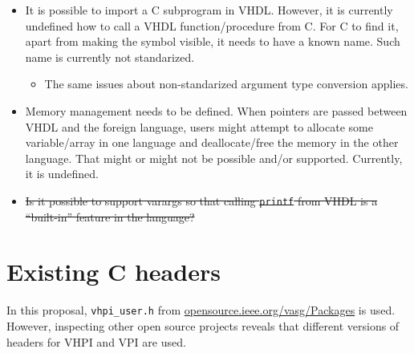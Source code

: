 \documentclass[
]{article}
\providecommand{\tightlist}{%
  \setlength{\itemsep}{0pt}\setlength{\parskip}{0pt}}
\begin{document}
\begin{itemize}
  \begin{itemize}
  \tightlist
  \item
    By the same token, VHDL procedures/functions can have arguments of mode \texttt{in}, \texttt{out} or \texttt{inout}, whereas in C functions are allowed to return a single argument. Hence, this is currently implementation-dependent.
  \end{itemize}
\item
  It is possible to import a C subprogram in VHDL. However, it is currently undefined how to call a VHDL function/procedure from C. For C to find it, apart from making the symbol visible, it needs to have a known name. Such name is currently not standarized.

  \begin{itemize}
  \tightlist
  \item
    The same issues about non-standarized argument type conversion applies.
  \end{itemize}
\item
  Memory management needs to be defined. When pointers are passed between VHDL and the foreign language, users might attempt to allocate some variable/array in one language and deallocate/free the memory in the other language. That might or might not be possible and/or supported. Currently, it is undefined.
\item
  \st{Is it possible to support varargs so that calling \mbox{\texttt{printf}} from VHDL is a ``built-in'' feature in the language?}
\end{itemize}

\hypertarget{existing-c-headers}{%
\section{Existing C headers}\label{existing-c-headers}}

In this proposal, \texttt{vhpi\_user.h} from \href{https://opensource.ieee.org/vasg/Packages/-/blob/release/code/vhpi_user.h}{opensource.ieee.org/vasg/Packages} is used. However, inspecting other open source projects reveals that different versions of headers for VHPI and VPI are used.
\end{document}
